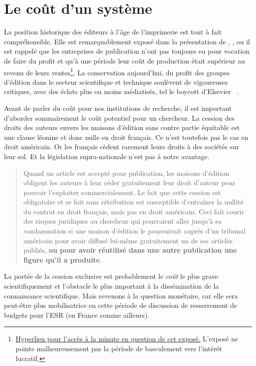 \section{Le coût d'un système}
La position historique des éditeurs à l'âge de l'imprimerie est tout à fait compréhensible.
Elle est remarquablement exposé dans la présentation de
 \citeauthor{fyfe_keynote:_2015}, , ou il est rappelé que les entreprises de publication n'ont pas toujours eu pour vocation de faire du profit et qu'à une période leur coût de production était supérieur au revenu de leurs ventes\footnote{ \href{https://www.youtube.com/watch?v=6X-AbNMWrmE&index=9&list=PLkW7KaGexWUDMPyF2RQAd2ieuxoTmCUZo&t=18m42s}{Hyperlien pour l'accès à la minute en question de cet exposé.} L'exposé ne pointe malheureusement pas la période de basculement vers l’intérêt lucratif.
}.
La conservation aujourd'hui, du profit des groupes d'édition dans le secteur scientifique et technique soulèvent de vigoureuses critiques, avec des éclats plus ou moins médiatisés, tel le boycott d'Elsevier
~\cite{_cost_????}.

Avant de parler du coût pour nos institutions de recherche, il est important d'aborder sommairement le coût potentiel pour un chercheur.
La cession des droits des auteurs envers les maisons d'édition sans contre partie équitable est une clause léonine et donc nulle en droit français.
Ce n'est toutefois pas le cas en droit américain.
Or les français cèdent rarement leurs droits à des sociétés sur leur sol.
Et la législation supra-nationale n'est pas à notre avantage. 
\blockcquote{marie_farge_avis_2011}{
Quand un article est accepté pour publication, les maisons d'édition obligent les auteurs à leur céder gratuitement leur droit d'auteur pour pouvoir l'exploiter commercialement.
Le fait que cette cession est obligatoire et se fait sans rétribution est susceptible d'entraîner la nullité du contrat en droit français, mais pas en droit américain.
Ceci fait courir des risques juridiques au chercheur qui pourraient aller jusqu'à sa condamnation si une maison d'édition le poursuivait auprès d'un tribunal américain pour avoir diffusé lui-même gratuitement un de ses articles publiés, \textbf{ou pour avoir réutilisé dans une autre publication une figure qu'il a produite}.
}
La portée de la cession exclusive est probablement le \emph{coût} le plus grave scientifiquement et l'obstacle le plus important à la dissémination de la connaissance scientifique.
Mais revenons à la question monétaire, car elle sera peut-être plus mobilisatrice en cette période de discussion de resserrement de budgets pour l'ESR (en France comme ailleurs).

